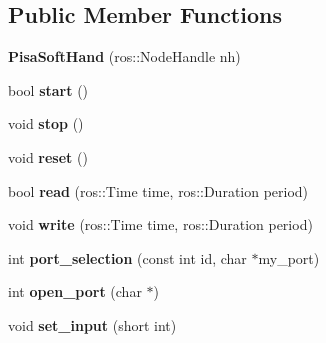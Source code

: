 \subsection*{Public Member Functions}
\begin{DoxyCompactItemize}
\item 
\hypertarget{class_pisa_soft_hand_a7d538758c22f8c000a6d5a939c640ed1}{{\bfseries Pisa\-Soft\-Hand} (ros\-::\-Node\-Handle nh)}\label{class_pisa_soft_hand_a7d538758c22f8c000a6d5a939c640ed1}

\item 
\hypertarget{class_pisa_soft_hand_aad2a5de4ca5080dce5477e13a0c1d6c7}{bool {\bfseries start} ()}\label{class_pisa_soft_hand_aad2a5de4ca5080dce5477e13a0c1d6c7}

\item 
\hypertarget{class_pisa_soft_hand_a43c234b45370dc282a10a90fe0e385ef}{void {\bfseries stop} ()}\label{class_pisa_soft_hand_a43c234b45370dc282a10a90fe0e385ef}

\item 
\hypertarget{class_pisa_soft_hand_a57682f3ab8d6e51ae34a22a75291388e}{void {\bfseries reset} ()}\label{class_pisa_soft_hand_a57682f3ab8d6e51ae34a22a75291388e}

\item 
\hypertarget{class_pisa_soft_hand_abf15b90fbe7646e26fd0f579806f5b01}{bool {\bfseries read} (ros\-::\-Time time, ros\-::\-Duration period)}\label{class_pisa_soft_hand_abf15b90fbe7646e26fd0f579806f5b01}

\item 
\hypertarget{class_pisa_soft_hand_ae0360f0996a1bc761b3e064bbedc755f}{void {\bfseries write} (ros\-::\-Time time, ros\-::\-Duration period)}\label{class_pisa_soft_hand_ae0360f0996a1bc761b3e064bbedc755f}

\item 
\hypertarget{class_pisa_soft_hand_adc94442a6cc1252beb7193ef442f7824}{int {\bfseries port\-\_\-selection} (const int id, char $\ast$my\-\_\-port)}\label{class_pisa_soft_hand_adc94442a6cc1252beb7193ef442f7824}

\item 
\hypertarget{class_pisa_soft_hand_a8b43f4c15cef48dfe688069d9f025669}{int {\bfseries open\-\_\-port} (char $\ast$)}\label{class_pisa_soft_hand_a8b43f4c15cef48dfe688069d9f025669}

\item 
\hypertarget{class_pisa_soft_hand_a012696951e4c570f58a8026e58fef83d}{void {\bfseries set\-\_\-input} (short int)}\label{class_pisa_soft_hand_a012696951e4c570f58a8026e58fef83d}


\end{DoxyCompactItemize}
